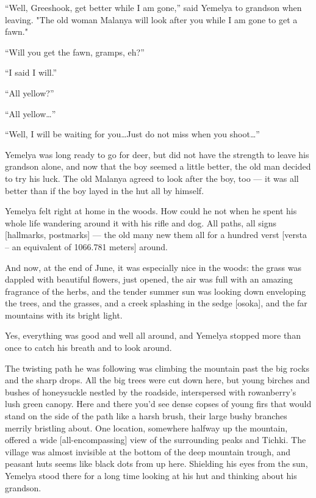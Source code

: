 \documentclass[b5paper,12pt,openany]{book}
\begin{document}
``Well, Greeshook, get better while I am gone,'' said Yemelya to grandson when leaving. "The old woman Malanya will look after you while I am gone to get a fawn."

``Will you get the fawn, gramps, eh?''

``I said I will.''

``All yellow?''

``All yellow\ldots''

``Well, I will be waiting for you\ldots Just do not miss when you shoot\ldots''

Yemelya was long ready to go for deer, but did not have the strength to leave his grandson alone, and now that the boy seemed a little better, the old man decided to try his luck. The old Malanya agreed to look after the boy, too --- it was all better than if the boy layed in the hut all by himself.

Yemelya felt right at home in the woods. How could he not when he spent his whole life wandering around it with his rifle and dog. All paths, all signs [hallmarks, postmarks] --- the old many new them all for a hundred verst [versta -- an equivalent of 1066.781 meters] around.

And now, at the end of June, it was especially nice in the woods: the grass was dappled with beautiful flowers, just opened, the air was full with an amazing fragrance of the herbs, and the tender summer sun was looking down enveloping the trees, and the grasses, and a creek splashing in the sedge [osoka], and the far mountains with its bright light.

Yes, everything was good and well all around, and Yemelya stopped more than once to catch his breath and to look around.

The twisting path he was following was climbing the mountain past the big rocks and the sharp drops. All the big trees were cut down here, but young birches and bushes of honeysuckle nestled by the roadside,  interspersed with rowanberry's lush green canopy.
Here and there you'd see dense copses of young firs that would stand on the side of the path like a harsh brush, their large bushy branches merrily bristling about.
One location, somewhere halfway up the mountain, offered a wide [all-encompassing] view of the surrounding peaks and Tichki. The village was almost invisible at the bottom of the deep mountain trough, and peasant huts seems like black dots from up here. Shielding his eyes from the sun, Yemelya stood there for a long time looking at his hut and thinking about his grandson.
\end{document}
